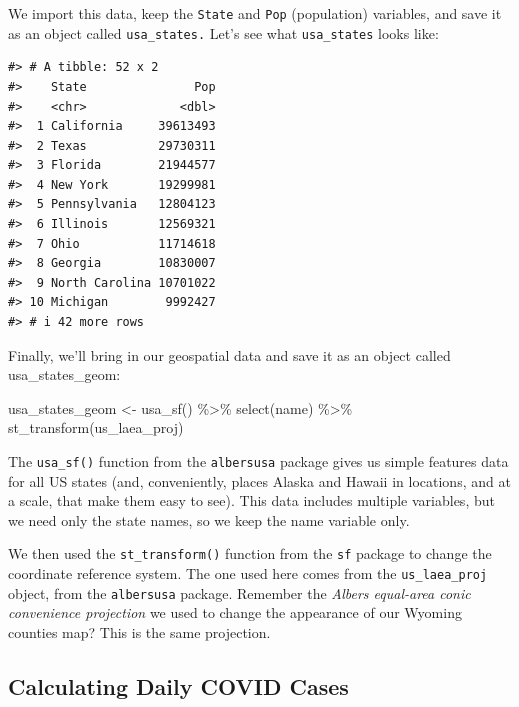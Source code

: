 \documentclass[
]{book}
\newenvironment{Shaded}{\begin{snugshade}}{\end{snugshade}}
\newcommand{\FunctionTok}[1]{\textcolor[rgb]{0.00,0.00,0.00}{#1}}
\newcommand{\NormalTok}[1]{#1}
\newcommand{\OtherTok}[1]{\textcolor[rgb]{0.56,0.35,0.01}{#1}}
\newcommand{\SpecialCharTok}[1]{\textcolor[rgb]{0.00,0.00,0.00}{#1}}
\begin{document}
We import this data, keep the \texttt{State} and \texttt{Pop} (population) variables, and save it as an object called \texttt{usa\_states.} Let's see what \texttt{usa\_states} looks like:

\begin{verbatim}
#> # A tibble: 52 x 2
#>    State               Pop
#>    <chr>             <dbl>
#>  1 California     39613493
#>  2 Texas          29730311
#>  3 Florida        21944577
#>  4 New York       19299981
#>  5 Pennsylvania   12804123
#>  6 Illinois       12569321
#>  7 Ohio           11714618
#>  8 Georgia        10830007
#>  9 North Carolina 10701022
#> 10 Michigan        9992427
#> # i 42 more rows
\end{verbatim}

Finally, we'll bring in our geospatial data and save it as an object called usa\_states\_geom:

\begin{Shaded}
\begin{Highlighting}[]
\NormalTok{usa\_states\_geom }\OtherTok{\textless{}{-}} \FunctionTok{usa\_sf}\NormalTok{() }\SpecialCharTok{\%\textgreater{}\%}
  \FunctionTok{select}\NormalTok{(name) }\SpecialCharTok{\%\textgreater{}\%}
  \FunctionTok{st\_transform}\NormalTok{(us\_laea\_proj)}
\end{Highlighting}
\end{Shaded}

The \texttt{usa\_sf()} function from the \texttt{albersusa} package gives us simple features data for all US states (and, conveniently, places Alaska and Hawaii in locations, and at a scale, that make them easy to see). This data includes multiple variables, but we need only the state names, so we keep the name variable only.

We then used the \texttt{st\_transform()} function from the \texttt{sf} package to change the coordinate reference system. The one used here comes from the \texttt{us\_laea\_proj} object, from the \texttt{albersusa} package. Remember the \emph{Albers equal-area conic convenience projection} we used to change the appearance of our Wyoming counties map? This is the same projection.

\hypertarget{calculating-daily-covid-cases}{%
\subsection*{Calculating Daily COVID Cases}\label{calculating-daily-covid-cases}}
\end{document}
